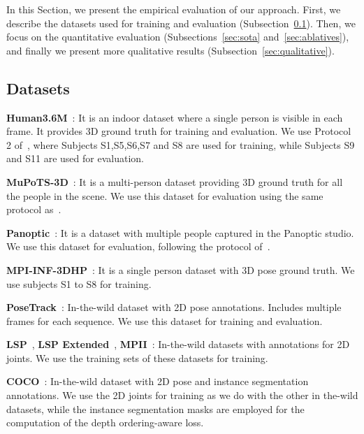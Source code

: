 In this Section, we present the empirical evaluation of our approach. First, we describe the datasets used for training and evaluation (Subsection~\ref{sec:datasets}). Then, we focus on the quantitative evaluation (Subsections~\ref{sec:sota} and~\ref{sec:ablatives}), and finally we present more qualitative results (Subsection~\ref{sec:qualitative}).

\subsection{Datasets} \label{sec:datasets}

\noindent
\textbf{Human3.6M}~\cite{ionescu2013human3}:
It is an indoor dataset where a single person is visible in each frame. It provides 3D ground truth for training and evaluation. We use Protocol 2 of~\cite{kanazawa2018end}, where Subjects S1,S5,S6,S7 and S8 are used for training, while Subjects S9 and S11 are used for evaluation.

\noindent
\textbf{MuPoTS-3D}~\cite{mehta2018single}:
It is a multi-person dataset providing 3D ground truth for all the people in the scene. We use this dataset for evaluation using the same protocol as~\cite{mehta2018single}.

\noindent
\textbf{Panoptic}~\cite{joo2015panoptic}:
It is a dataset with multiple people captured in the Panoptic studio. We use this dataset for evaluation, following the protocol of~\cite{zanfir2018monocular}.

\noindent
\textbf{MPI-INF-3DHP}~\cite{mehta2017monocular}:
It is a single person dataset with 3D pose ground truth. We use subjects S1 to S8 for training.

\noindent
\textbf{PoseTrack}~\cite{andriluka2018posetrack}:
In-the-wild dataset with 2D pose annotations. Includes multiple frames for each sequence. We use this dataset for training and evaluation.

\noindent
\textbf{LSP}~\cite{johnson2010clustered}, \textbf{LSP Extended}~\cite{johnson2011learning}, \textbf{MPII}~\cite{andriluka20142d}:
In-the-wild datasets with annotations for 2D joints. We use the training sets of these datasets for training.

\noindent
\textbf{COCO}~\cite{lin2014microsoft}:
In-the-wild dataset with 2D pose and instance segmentation annotations. We use the 2D joints for training as we do with the other in the-wild datasets, while the instance segmentation masks are employed for the computation of the depth ordering-aware loss.


